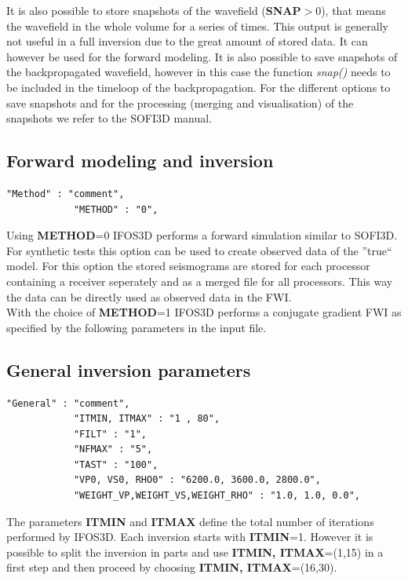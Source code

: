 It is also possible to store snapshots of the wavefield (\textbf{SNAP}$>$0), that means the wavefield in the whole volume for a series of times. This output is generally not useful in a full inversion due to the great amount of stored data. It can however be used for the forward modeling. It is also possible to save snapshots of the backpropagated wavefield, however in this case the function \textit{snap()} needs to be included in the timeloop of the backpropagation. For the different options to save snapshots and for the processing (merging and visualisation) of the snapshots we refer to the SOFI3D manual.
\subsection{Forward modeling and inversion}
\begin{verbatim}
"Method" : "comment",
			"METHOD" : "0",
\end{verbatim}

Using \textbf{METHOD}=0 IFOS3D performs a forward simulation similar to SOFI3D. For synthetic tests this option can be used to create observed data of the ''true`` model. For this option the stored seismograms are stored for each processor containing a receiver seperately and as a merged file for all processors. This way the data can be directly used as observed data in the FWI.\\
With the choice of \textbf{METHOD}=1 IFOS3D performs a conjugate gradient FWI as specified by the following parameters in the input file.
\subsection{General inversion parameters}
\begin{verbatim}
"General" : "comment",
			"ITMIN, ITMAX" : "1 , 80",
			"FILT" : "1",
			"NFMAX" : "5",
			"TAST" : "100",
			"VP0, VS0, RHO0" : "6200.0, 3600.0, 2800.0",
			"WEIGHT_VP,WEIGHT_VS,WEIGHT_RHO" : "1.0, 1.0, 0.0",
\end{verbatim}

The parameters \textbf{ITMIN} and \textbf{ITMAX} define the total number of iterations performed by IFOS3D. Each inversion starts with \textbf{ITMIN}=1. However it is possible to split the inversion in parts and use \textbf{ITMIN, ITMAX}=(1,15) in a first step and then proceed by choosing \textbf{ITMIN, ITMAX}=(16,30). 
\vspace{0.3cm}\\

